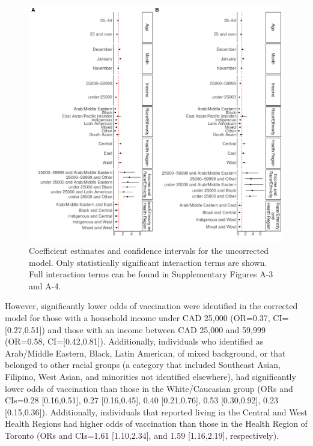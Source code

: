 \documentclass[
]{article}
\begin{document}
\begin{figure}

\includegraphics{main_files/figure-pdf/fig-models-1.pdf} \hfill{}

\caption{\label{fig-models}Coefficient estimates and confidence
intervals for the uncorrected model. Only statistically significant
interaction terms are shown. Full interaction terms can be found in
Supplementary Figures A-3 and A-4.}

\end{figure}

However, significantly lower odds of vaccination were identified in the
corrected model for those with a household income under CAD 25,000
(OR=0.37, CI={[}0.27,0.51{]}) and those with an income between CAD
25,000 and 59,999 (OR=0.58, CI={[}0.42,0.81{]}). Additionally,
individuals who identified as Arab/Middle Eastern, Black, Latin
American, of mixed background, or that belonged to other racial groups
(a category that included Southeast Asian, Filipino, West Asian, and
minorities not identified elsewhere), had significantly lower odds of
vaccination than those in the White/Caucasian group (ORs and CIs=0.28
{[}0.16,0.51{]}, 0.27 {[}0.16,0.45{]}, 0.40 {[}0.21,0.76{]}, 0.53
{[}0.30,0.92{]}, 0.23 {[}0.15,0.36{]}). Additionally, individuals that
reported living in the Central and West Health Regions had higher odds
of vaccination than those in the Health Region of Toronto (ORs and
CIs=1.61 {[}1.10,2.34{]}, and 1.59 {[}1.16,2.19{]}, respectively).
\end{document}
